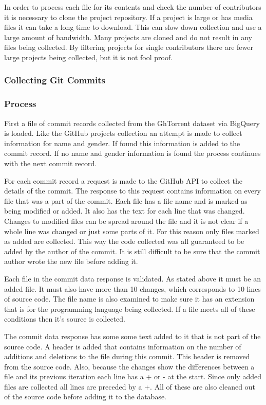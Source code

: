 \documentclass{article}
\begin{document}
In order to process each file for its contents and check the number of contributors it is necessary to clone the project repository. If a project is large or has media files it can take a long time to download. This can slow down collection and use a large amount of bandwidth. Many projects are cloned and do not result in any files being collected. By filtering projects for single contributors there are fewer large projects being collected, but it is not fool proof.


\subsubsection{Collecting Git Commits}

\subsubsection*{Process}
First a file of commit records collected from the GhTorrent dataset via BigQuery is loaded. Like the GitHub projects collection an attempt is made to collect information for name and gender. If found this information is added to the commit record. If no name and gender information is found the process continues with the next commit record.

For each commit record a request is made to the GitHub API to collect the details of the commit. The response to this request contains information on every file that was a part of the commit. Each file has a file name and is marked as being modified or added. It also has the text for each line that was changed. Changes to modified files can be spread around the file and it is not clear if a whole line was changed or just some parts of it. For this reason only files marked as added are collected. This way the code collected was all guaranteed to be added by the author of the commit. It is still difficult to be sure that the commit author wrote the new file before adding it.

Each file in the commit data response is validated. As stated above it must be an added file. It must also have more than 10 changes, which corresponds to 10 lines of source code. The file name is also examined to make sure it has an extension that is for the programming language being collected. If a file meets all of these conditions then it's source is collected.

The commit data response has some some text added to it that is not part of the source code. A header is added that contains information on the number of additions and deletions to the file during this commit. This header is removed from the source code. Also, because the changes show the differences between a file and its previous iteration each line has a + or - at the start. Since only added files are collected all lines are preceded by a +. All of these are also cleaned out of the source code before adding it to the database.
\end{document}
